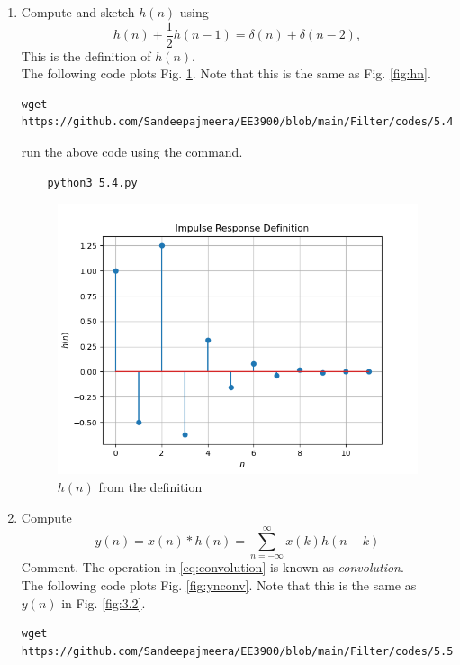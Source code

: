 \documentclass[journal,12pt,twocolumn]{IEEEtran}
\renewcommand\thesection{\arabic{section}}
\begin{document}
\begin{enumerate}[label=\thesection.\arabic*
,ref=\thesection.\theenumi]
\item Compute and sketch $h(n)$ using 
\begin{equation}
\label{eq:iir_filter_h}
h(n) + \frac{1}{2}h(n-1) = \delta(n) + \delta(n-2), 
\end{equation}
%
This is the definition of $h(n)$.
\\
\solution The following code plots Fig. \ref{fig:hndef}. Note that this is the same as Fig. 
\ref{fig:hn}. 
%
\begin{lstlisting}
wget https://github.com/Sandeepajmeera/EE3900/blob/main/Filter/codes/5.4.py
\end{lstlisting}
run the above code using the command.
\begin{lstlisting}
	python3 5.4.py
\end{lstlisting}
\begin{figure}[!ht]
\centering
\includegraphics[width=\columnwidth]{./figs/5.4.png}
\caption{$h(n)$ from the definition}
\label{fig:hndef}
\end{figure}
%
\item Compute 
%
\begin{equation}
\label{eq:convolution}
y(n) = x(n)*h(n) = \sum_{n=-\infty}^{\infty}x(k)h(n-k)
\end{equation}
%
Comment. The operation in \eqref{eq:convolution} is known as
{\em convolution}.
%
\\
\solution The following code plots Fig. \ref{fig:ynconv}. Note that this is the same as 
$y(n)$ in  Fig. 
\ref{fig:3.2}. 
%
\begin{lstlisting}
wget https://github.com/Sandeepajmeera/EE3900/blob/main/Filter/codes/5.5.py

\end{lstlisting}
\end{enumerate}
\end{document}
